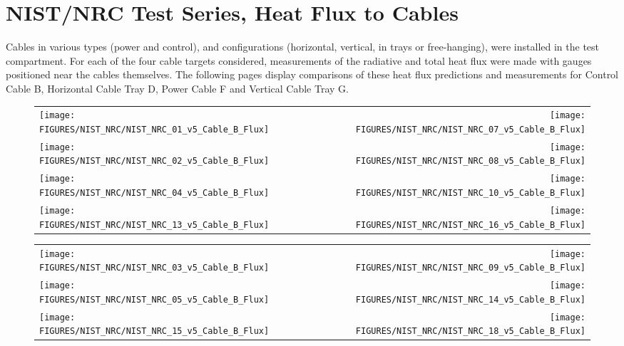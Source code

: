 \clearpage

\section{NIST/NRC Test Series, Heat Flux to Cables}

Cables in various types (power and control), and configurations (horizontal, vertical, in trays or free-hanging), were installed in
the test compartment. For each of the four cable targets considered, measurements of the radiative and total heat flux were made with
gauges positioned near the cables themselves.  The following pages display comparisons of these heat flux predictions and measurements for
Control Cable B, Horizontal Cable Tray D, Power Cable F and Vertical Cable Tray G.

\begin{figure}[p]
\begin{tabular*}{\textwidth}{l@{\extracolsep{\fill}}r}
\texttt{[image: FIGURES/NIST\_NRC/NIST\_NRC\_01\_v5\_Cable\_B\_Flux]} &
\texttt{[image: FIGURES/NIST\_NRC/NIST\_NRC\_07\_v5\_Cable\_B\_Flux]} \\
\texttt{[image: FIGURES/NIST\_NRC/NIST\_NRC\_02\_v5\_Cable\_B\_Flux]} &
\texttt{[image: FIGURES/NIST\_NRC/NIST\_NRC\_08\_v5\_Cable\_B\_Flux]} \\
\texttt{[image: FIGURES/NIST\_NRC/NIST\_NRC\_04\_v5\_Cable\_B\_Flux]} &
\texttt{[image: FIGURES/NIST\_NRC/NIST\_NRC\_10\_v5\_Cable\_B\_Flux]} \\
\texttt{[image: FIGURES/NIST\_NRC/NIST\_NRC\_13\_v5\_Cable\_B\_Flux]} &
\texttt{[image: FIGURES/NIST\_NRC/NIST\_NRC\_16\_v5\_Cable\_B\_Flux]}
\end{tabular*}
\label{NIST_NRC_Cable_B_Flux_Closed}
\end{figure}

\begin{figure}[p]
\begin{tabular*}{\textwidth}{l@{\extracolsep{\fill}}r}
\texttt{[image: FIGURES/NIST\_NRC/NIST\_NRC\_03\_v5\_Cable\_B\_Flux]} &
\texttt{[image: FIGURES/NIST\_NRC/NIST\_NRC\_09\_v5\_Cable\_B\_Flux]} \\
\texttt{[image: FIGURES/NIST\_NRC/NIST\_NRC\_05\_v5\_Cable\_B\_Flux]} &
\texttt{[image: FIGURES/NIST\_NRC/NIST\_NRC\_14\_v5\_Cable\_B\_Flux]} \\
\texttt{[image: FIGURES/NIST\_NRC/NIST\_NRC\_15\_v5\_Cable\_B\_Flux]} &
\texttt{[image: FIGURES/NIST\_NRC/NIST\_NRC\_18\_v5\_Cable\_B\_Flux]}
\end{tabular*}
\label{NIST_NRC_Cable_B_Flux_Open}
\end{figure}

